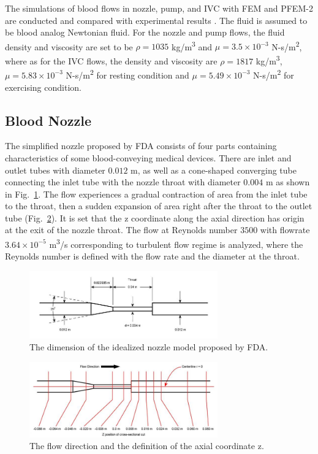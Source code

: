 The simulations of blood flows in nozzle, pump, and IVC with FEM and PFEM-2 are conducted and compared with experimental results \cite{fda_res,fda_nozzle ,fda_pump,gallagher_exp}. The fluid is assumed to be blood analog Newtonian fluid. For the nozzle and pump flows, the fluid density and viscosity are set to be $\rho= 1035$ kg/m\textsuperscript{3} and $\mu =3.5\times10^{-3}$ N-s/m\textsuperscript{2}, where as for the IVC flows, the density and viscosity are $\rho=1817$ kg/m\textsuperscript{3}, $\mu=5.83\times10^{-3}$ N-s/m\textsuperscript{2} for resting condition and $\mu=5.49\times10^{-3}$ N-s/m\textsuperscript{2} for exercising condition. 

\subsection{Blood Nozzle}

The simplified nozzle proposed by FDA consists of four parts containing characteristics of some blood-conveying medical devices. There are inlet and outlet tubes with diameter $0.012$ m, as well as a cone-shaped converging tube connecting the inlet tube with the nozzle throat with diameter $0.004$ m as shown in Fig.~\ref{fig:nozzlegeo1}. The flow experiences a gradual contraction of area from the inlet tube to the throat, then a sudden expansion of area right after the throat to the outlet tube (Fig.~\ref{fig:nozzlegeo2}). It is set that the z coordinate along the axial direction has origin at the exit of the nozzle throat. The flow at Reynolds number $3500$ with flowrate $3.64\times10^{-5}$ m\textsuperscript{3}/s corresponding to turbulent flow regime is analyzed, where the Reynolds number is defined with the flow rate and the diameter at the throat. 

\begin{figure}[htbp]
    \centering
    \includegraphics[width=3.2in]{imgs/nozzle_pump/nozzle_geo.jpg}
    \caption{The dimension of the idealized nozzle model proposed by FDA.}
    \label{fig:nozzlegeo1}
\end{figure}
\begin{figure}[htbp]
    \centering
    \includegraphics[width=3.2in]{imgs/nozzle_pump/nozzle_CS.jpg}
    \caption{The flow direction and the definition of the axial coordinate z.}
    \label{fig:nozzlegeo2}
\end{figure}


